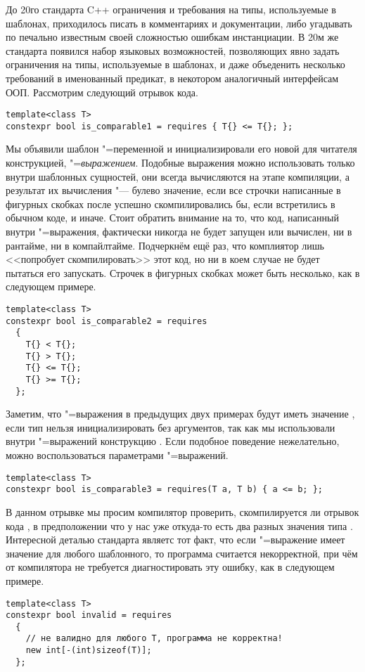 До 20го стандарта C++ ограничения и требования на типы, используемые в шаблонах, приходилось писать в комментариях и документации, либо угадывать по печально известным своей сложностью ошибкам инстанциации.
В 20м же стандарта появился набор языковых возможностей, позволяющих явно задать ограничения на типы, используемые в шаблонах, и даже объеденить несколько требований в именованный предикат, в некотором аналогичный интерфейсам ООП.
Рассмотрим следующий отрывок кода.
\begin{verbatim}
template<class T>
constexpr bool is_comparable1 = requires { T{} <= T{}; };
\end{verbatim}
Мы объявили шаблон "=переменной и инициализировали его новой для читателя конструкцией, "=\textit{выражением}.
Подобные выражения можно использовать только внутри шаблонных сущностей, они всегда вычисляются на этапе компиляции, а результат их вычисления "--- булево значение,  если все строчки написанные в фигурных скобках после  успешно скомпилировались бы, если встретились в обычном коде, и  иначе.
Стоит обратить внимание на то, что код, написанный внутри "=выражения, фактически никогда не будет запущен или вычислен, ни в рантайме, ни в компайлтайме.
Подчеркнём ещё раз, что комплиятор лишь <<попробует скомпилировать>> этот код, но ни в коем случае не будет пытаться его запускать.
Строчек в фигурных скобках может быть несколько, как в следующем примере.
\begin{verbatim}
template<class T>
constexpr bool is_comparable2 = requires
  {
    T{} < T{};
    T{} > T{};
    T{} <= T{};
    T{} >= T{};
  };
\end{verbatim}
Заметим, что "=выражения в предыдущих двух примерах будут иметь значение , если тип  нельзя инициализировать без аргументов, так как мы использовали внутри "=выражений конструкцию .
Если подобное поведение нежелательно, можно воспользоваться параметрами "=выражений.
\begin{verbatim}
template<class T>
constexpr bool is_comparable3 = requires(T a, T b) { a <= b; };
\end{verbatim}
В данном отрывке мы просим компилятор проверить, скомпилируется ли отрывок кода , в предположении что у нас уже откуда-то есть два разных значения типа .
Интересной деталью стандарта являетс тот факт, что если "=выражение имеет значение  для любого шаблонного, то программа считается некорректной, при чём от компилятора не требуется диагностировать эту ошибку, как в следующем примере.
\begin{verbatim}
template<class T>
constexpr bool invalid = requires
  {
    // не валидно для любого T, программа не корректна!
    new int[-(int)sizeof(T)];
  };
\end{verbatim}


